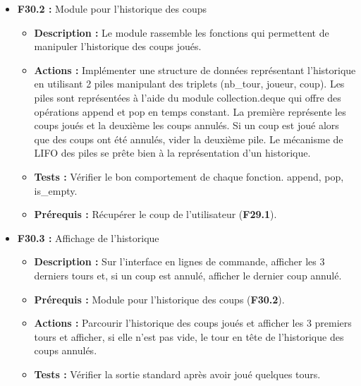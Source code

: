 \documentclass{article}
\begin{document}
\begin{itemize}
\begin{itemize}
\begin{itemize}
\begin{itemize}
                \item \textbf{Tests :} Vérifier la valeur de la tête de pile de l’historique des coups joués lorsqu’un tour se finit.
                \item \textbf{Prérequis :} Module pour l'historique des coups (\textbf{F30.2}).
            \end{itemize}
            \smallskip
            \item \textbf{F30.2 :} Module pour l'historique des coups
            \begin{itemize}
                \item \textbf{Description :} Le module rassemble les fonctions qui permettent de manipuler l’historique des coups joués.
                \item \textbf{Actions :} Implémenter une structure de données représentant l’historique en utilisant 2 piles manipulant des triplets (nb\_tour, joueur, coup). Les piles sont représentées à l’aide du module collection.deque qui offre des opérations append et pop en temps constant. La première représente les coups joués et la deuxième les coups annulés. Si un coup est joué alors que des coups ont été annulés, vider la deuxième pile. Le mécanisme de LIFO des piles se prête bien à la représentation d’un historique.
                \item \textbf{Tests :} Vérifier le bon comportement de chaque fonction. append, pop, is\_empty.
                \item \textbf{Prérequis :} Récupérer le coup de l’utilisateur (\textbf{F29.1}).
            \end{itemize}
            \smallskip
            \item \textbf{F30.3 :} Affichage de l’historique
            \begin{itemize}
                \item \textbf{Description :} Sur l’interface en lignes de commande, afficher les 3 derniers tours et, si un coup est annulé, afficher le dernier coup annulé.
                \item \textbf{Prérequis :} Module pour l'historique des coups (\textbf{F30.2}).
                \item \textbf{Actions :} Parcourir l’historique des coups joués et afficher les 3 premiers tours et afficher, si elle n’est pas vide, le tour en tête de l’historique des coups annulés.
                \item \textbf{Tests :} Vérifier la sortie standard après avoir joué quelques tours.

\end{itemize}
\end{itemize}
\end{itemize}
\end{itemize}
\end{document}
